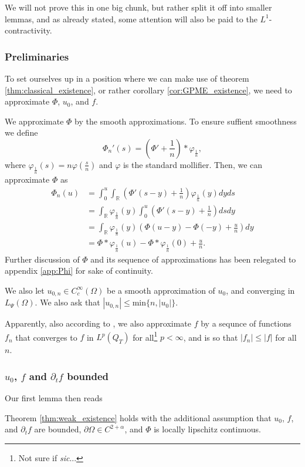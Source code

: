 \documentclass[11pt, a4paper]{article}
\begin{document}
We will not prove this in one big chunk, but rather split it off into smaller lemmas, and as already stated, some attention will also be paid to the $L^1$-contractivity.
\subsubsection{Preliminaries}
To set ourselves up in a position where we can make use of theorem \ref{thm:classical_existence}, or rather corollary \ref{cor:GPME_existence}, we need to approximate $\Phi$, $u_0$, and $f$.

We approximate $\Phi$ by the smooth approximations. To ensure suffient smoothness we define
\begin{equation*}
\Phi_n'(s) = \left( \Phi' + \frac{1}{n}\right)*\varphi_{\frac{1}{n}},
\end{equation*}
where $\varphi_{\frac{1}{n}}(s) = n\varphi\left( \frac{s}{n} \right)$ and $\varphi$ is the standard mollifier. Then, we can approximate $\Phi$ as
\begin{align*}
\Phi_n(u) &= \int_0^u \int_\mathbb{R}\left( \Phi'(s-y) + \frac{1}{n}\right)\varphi_{\frac{1}{n}}(y)dyds \\
&= \int_\mathbb{R}\varphi_{\frac{1}{n}}(y) \int_0^u \left( \Phi'(s-y) + \frac{1}{n}\right)dsdy \\
&= \int_\mathbb{R}\varphi_{\frac{1}{n}}(y) \left( \Phi(u-y) - \Phi(-y) + \frac{u}{n}\right)dy \\
&= \Phi * \varphi_{\frac{1}{n}}(u) - \Phi * \varphi_{\frac{1}{n}}(0) + \frac{u}{n}.
\end{align*}
Further discussion of $\Phi$ and its sequence of approximations has been relegated to appendix \ref{app:Phi} for sake of continuity.




We also let $u_{0,n}\in C^\infty_c(\Omega)$ be a smooth approximation of $u_0$, and converging in $L_\Psi(\Omega)$. We also ask that $|u_{0,n}| \leq $min$\{n,|u_0|\}$.

Apparently, also according to \citep{vazquez2007porous}, we also approximate $f$ by a sequnce of functions $f_n$ that converges to $f$ in $L^p(Q_T)$ for all\footnote{Not sure if \textit{sic}...} $p<\infty$, and is so that $|f_n| \leq |f|$ for all $n$.

\subsubsection{$u_0$, $f$ and $\partial_t f$ bounded}
Our first lemma then reads
\begin{lemma}
Theorem \ref{thm:weak_existence} holds with the additional assumption that $u_0$, $f$, and $\partial_t f$ are bounded, $\partial \Omega \in C^{2+\alpha}$, and $\Phi$ is locally lipschitz continuous.
\end{lemma}
\end{document}

